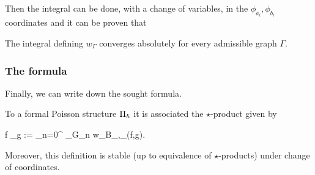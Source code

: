 Then the integral can be done, with a change of variables, in the $\phi_{a_i}, \phi_{b_i}$ coordinates and it can be proven that

\begin{lemma}
	The integral defining $w_\Gamma$ converges absolutely for every admissible graph $\Gamma$.
\end{lemma}

\subsubsection{The formula}
Finally, we can write down the sought formula.

\begin{theorem}
	To a formal Poisson structure $\Pi_{\boldsymbol\hslash}$ it is associated the $\star$-product given by
	\begin{eqalign}
		f \star_\planck g := \sum_{n=0}^\infty {} \sum_{\Gamma \in G_n} w_\Gamma B_{\Gamma,\Pi_\planck}(f,g).
	\end{eqalign}
	Moreover, this definition is stable (up to equivalence of $\star$-products) under change of coordinates.
\end{theorem}

